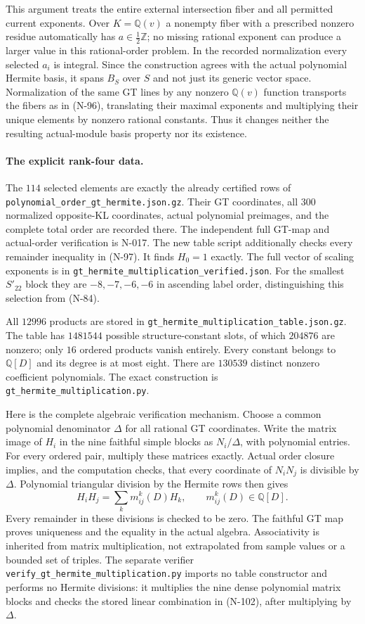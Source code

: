 This argument treats the entire external intersection fiber and all
permitted current exponents.  Over $K=\mathbb Q(v)$ a nonempty
fiber with a prescribed nonzero residue automatically has
$a\in\tfrac12\mathbb Z$; no missing rational exponent can produce
a larger value in this rational-order problem.  In the recorded
normalization every selected $a_i$ is integral.  Since the construction
agrees with the actual polynomial Hermite basis, it spans $B_S$ over
$S$ and not just its generic vector space.  Normalization of the same
GT lines by any nonzero $\mathbb Q(v)$ function transports the fibers
as in (N-96), translating their maximal exponents and multiplying
their unique elements by nonzero rational constants.  Thus it changes
neither the resulting actual-module basis property nor its existence.

\paragraph{The explicit rank-four data.}
The $114$ selected elements are exactly the already certified rows of
\nolinkurl{polynomial_order_gt_hermite.json.gz}.  Their GT coordinates,
all $300$ normalized opposite-KL coordinates, actual polynomial
preimages, and the complete total order are recorded there.
The independent full GT-map and actual-order verification is N-017.
The new table script additionally checks every remainder inequality
in (N-97).  It finds $H_0=1$ exactly.  The full vector of scaling
exponents is in \nolinkurl{gt_hermite_multiplication_verified.json}.
For the smallest $S'_{22}$ block they are $-8,-7,-6,-6$ in ascending
label order, distinguishing this selection from (N-84).

All $12996$ products are stored in
\nolinkurl{gt_hermite_multiplication_table.json.gz}.
The table has $1481544$ possible structure-constant slots, of which
$204876$ are nonzero; only $16$ ordered products vanish entirely.
Every constant belongs to $\mathbb Q[D]$ and its degree is at most
eight.  There are $130539$ distinct nonzero coefficient polynomials.
The exact construction is
\nolinkurl{gt_hermite_multiplication.py}.

Here is the complete algebraic verification mechanism.  Choose a
common polynomial denominator $\Delta$ for all rational GT
coordinates.  Write the matrix image of $H_i$ in the nine faithful
simple blocks as $N_i/\Delta$, with polynomial entries.
For every ordered pair, multiply these matrices exactly.  Actual
order closure implies, and the computation checks, that every
coordinate of $N_iN_j$ is divisible by $\Delta$.
Polynomial triangular division by the Hermite rows then gives
\[
 H_iH_j=\sum_k m_{ij}^k(D)H_k,
 \qquad m_{ij}^k(D)\in\mathbb Q[D].
 \tag{N-102}
\]
Every remainder in these divisions is checked to be zero.
The faithful GT map proves uniqueness and the equality in the
actual algebra.  Associativity is inherited from matrix
multiplication, not extrapolated from sample values or a bounded
set of triples.  The separate verifier
\nolinkurl{verify_gt_hermite_multiplication.py} imports no table
constructor and performs no Hermite divisions: it multiplies the
nine dense polynomial matrix blocks and checks the stored linear
combination in (N-102), after multiplying by $\Delta$.

